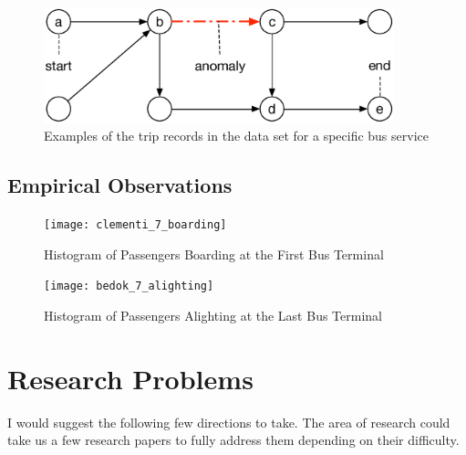 \documentclass{sig-alternate}
\begin{document}
\begin{figure}[htb]
	\centering
	\includegraphics[width=4.0in]{travel_graph}
	\caption{Examples of the trip records in the data set for a specific bus service}
	\label{fig:travel_graph}
\end{figure}

\subsection{Empirical Observations}

\begin{figure}[htb]
	\centering
	\texttt{[image: clementi\_7\_boarding]}
	\caption{Histogram of Passengers Boarding at the First Bus Terminal}
	\label{fig:travel_graph}
\end{figure}

\begin{figure}[htb]
	\centering
	\texttt{[image: bedok\_7\_alighting]}
	\caption{Histogram of Passengers Alighting at the Last Bus Terminal}
	\label{fig:travel_graph}
\end{figure}

\section{Research Problems}

I would suggest the following few directions to take. The area of research could take us a few research papers to fully address them depending on their difficulty.

\end{document}
